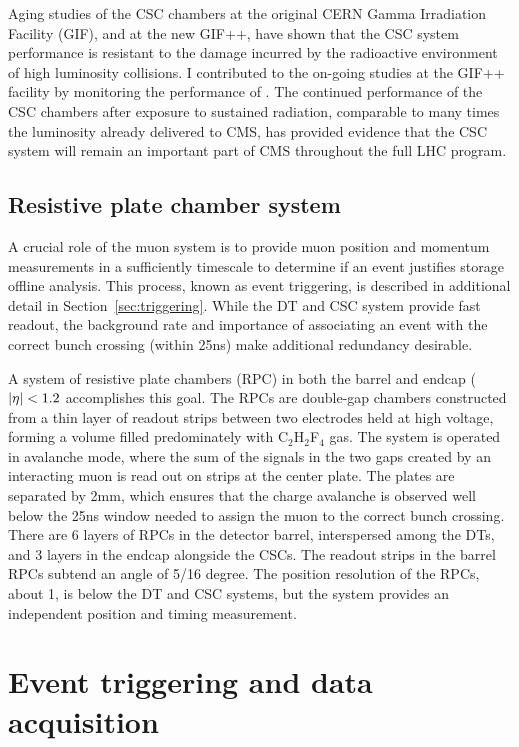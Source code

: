 Aging studies of the CSC chambers at the original CERN Gamma
Irradiation Facility (GIF), and at the new GIF++, have shown that the CSC system
performance is resistant to the damage incurred by the radioactive environment
of high luminosity collisions. I contributed to the on-going studies at the 
GIF++ facility by monitoring the performance of . The continued performance
of the CSC chambers after exposure to sustained radiation, comparable
to many times the luminosity already delivered to CMS,
has provided evidence that the CSC system will remain an important part
of CMS throughout the full LHC program.

\subsection{Resistive plate chamber system}

A crucial role of the muon system is to provide muon position and momentum
measurements in a sufficiently timescale
to determine if an event justifies storage offline analysis. 
This process, known as event triggering,
is described in additional detail in Section~\ref{sec:triggering}.
While the DT and CSC system provide fast readout, the background rate and
importance of associating an event with the correct bunch crossing (within
25\unit{ns}) make additional redundancy desirable.

A system of resistive plate chambers (RPC) in both the barrel and endcap
($\lvert \eta \rvert < 1.2$ accomplishes this goal. The RPCs are double-gap chambers
constructed from a thin layer of readout strips between two electrodes held 
at high voltage, forming a volume filled predominately with C$_2$H$_2$F$_4$ gas.
The system is operated in avalanche mode, where the sum of the signals
in the two gaps created by an interacting muon is read out on strips
at the center plate. The plates are separated by 2\unit{mm}, which ensures
that the charge avalanche is observed well below the 25\unit{ns} window
needed to assign the muon to the correct bunch crossing.
There are 6 layers of RPCs in the detector barrel, interspersed among the DTs,
and 3 layers in the endcap alongside the CSCs. The readout strips in the barrel RPCs
subtend an angle of 5/16 degree. The position resolution of the RPCs, about 1\cm,
is below the DT and CSC systems, but the system provides an independent position
and timing measurement. 

\section{Event triggering and data acquisition}

